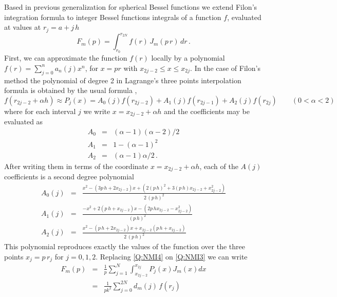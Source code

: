 Based in previous generalization for spherical Bessel functions
\cite{Sommer1979CPCp383} we extend Filon's integration formula
\cite[see][]{Press1966_NRIvI} to integer Bessel functions integrals of a
function $f$, evaluated at values at $r_{j}= a + j\, h$
\begin{equation}\label{Q:NMI3}
  F_{m}(p) = \int_{r_{0}}^{r_{2N}} f(r) \, J_{m}(p\,r) \, d r \,.
\end{equation}
First, we can approximate the function $f(r)$ locally by a polynomial
$f(r) = \sum_{j=0}^{n} a_{n}(j) x^{n}$, for $x=pr$ with $x_{2j-2} \le x
\le x_{2j}$. In the case of Filon's method the polynomial of degree 2
in Lagrange's three points interpolation formula is obtained by the usual formula \cite{Press1966_NRIvI},
%
\begin{equation}\label{Q:NMI4} 
f(r_{2 j-2} + \alpha h) \approx  P_{j}(x) = A_{0}(j) f(r_{2j-2})+
A_{1}(j) f(r_{2j-1}) + A_{2}(j) f(r_{2j}) \qquad (0 < \alpha < 2)
\end{equation}
where for each interval $j$ we write $x= x_{2j-2}+\alpha h$ and the coefficients may be evaluated as
\begin{eqnarray*}
A_{0}  &=& (\alpha-1)(\alpha-2)/2 \\
A_{1}&=& 1-(\alpha-1)^{2} \\
A_{2} &=& (\alpha-1)\alpha/2 \,.
\end{eqnarray*}
%
After writing them in terms of the coordinate $x= x_{2j-2}+\alpha h$, each of the $A(j)$ coefficients is a second degree polynomial
\begin{eqnarray}
A_{0}(j) &=& \frac{ x^{2} - (3 p\, h + 2 x_{2j-2}) x  + \left( 2 (p\,
h)^{2} + 3 (p\, h) x_{2j-2} + x_{2j-2}^{2} \right)}{2 \,(p\, h)^{2}}
\nonumber
  \\ \label{Q:NMI6}
A_{1}(j) &=& \frac{-x^{2} + 2 (p\, h + x_{2j-2}) x  - \left( 2 p\, h
x_{2j-2} - x_{2j-2}^{2} \right)}{(p\, h)^{2}}
\\
A_{2}(j) &=& \frac{ x^{2} - (p\, h + 2 x_{2j-2}) x  + x_{2j-2}
\left(p\, h + x_{2j-2} \right)}{2 \,(p\, h)^{2}} \nonumber
\end{eqnarray}
%
This polynomial reproduces exactly the values of the function over the
three points $x_{j}=p \,r_{j}$ for $j=0,1,2$. Replacing \ref{Q:NMI4} on
\ref{Q:NMI3} we can write
\begin{eqnarray}\label{Q:NMI6b}
F_{m}(p) &=& \frac{1}{p} \sum_{j=1}^{N} \int_{x_{2j-2}}^{x_{2j}}
P_{j}(x)
J_{m}(x) d x \\
&=& \frac{1}{p k^{2}} \sum_{j=0}^{2N} d_{m}(j) \,  f(r_{j}) \nonumber
\end{eqnarray}
